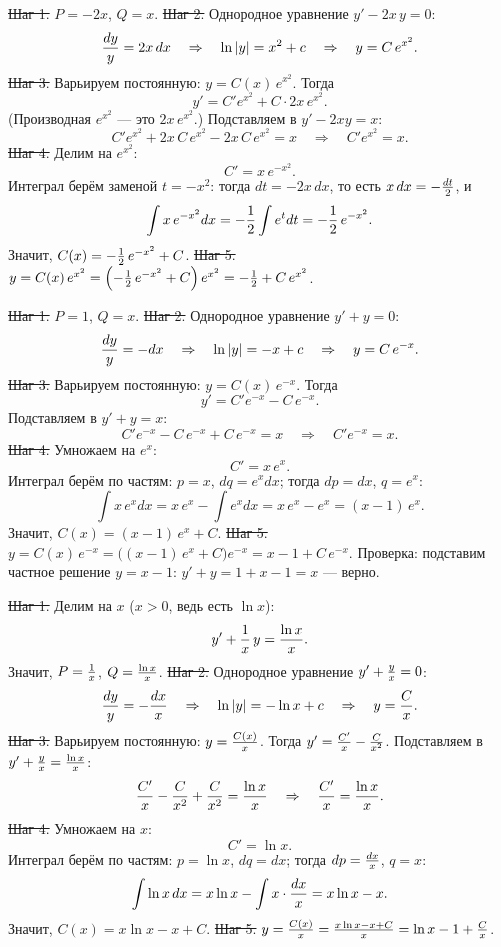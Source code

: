 \st{Шаг 1.} $P=-2x$, $Q=x$.
\st{Шаг 2.} Однородное уравнение $y'-2x\,y=0$:
$${dy\over y}=2x\,dx\quad\Rightarrow\quad\ln|y|=x^2+c
\quad\Rightarrow\quad y=C\,e^{x^2}.$$
\st{Шаг 3.} Варьируем постоянную: $y=C(x)\,e^{x^2}$. Тогда
$$y'=C'e^{x^2}+C\cdot2x\,e^{x^2}.$$
(Производная $e^{x^2}$ --- это $2x\,e^{x^2}$.) Подставляем в $y'-2xy=x$:
$$C'e^{x^2}+2x\,C\,e^{x^2}-2x\,C\,e^{x^2}=x\quad\Rightarrow\quad
C'e^{x^2}=x.$$
\st{Шаг 4.} Делим на $e^{x^2}$:
$$C'=x\,e^{-x^2}.$$
Интеграл берём заменой $t=-x^2$: тогда $dt=-2x\,dx$, то есть
$x\,dx=-{dt\over2}$, и
$$\int x\,e^{-x^2}dx=-{1\over2}\int e^{t}dt=-{1\over2}\,e^{-x^2}.$$
Значит, $C(x)=-{1\over2}\,e^{-x^2}+C$.
\st{Шаг 5.} $y=C(x)\,e^{x^2}=\left(-{1\over2}\,e^{-x^2}+C\right)e^{x^2}
=-{1\over2}+C\,e^{x^2}$.

\st{Шаг 1.} $P=1$, $Q=x$.
\st{Шаг 2.} Однородное уравнение $y'+y=0$:
$${dy\over y}=-dx\quad\Rightarrow\quad\ln|y|=-x+c
\quad\Rightarrow\quad y=C\,e^{-x}.$$
\st{Шаг 3.} Варьируем постоянную: $y=C(x)\,e^{-x}$. Тогда
$$y'=C'e^{-x}-C\,e^{-x}.$$
Подставляем в $y'+y=x$:
$$C'e^{-x}-C\,e^{-x}+C\,e^{-x}=x\quad\Rightarrow\quad C'e^{-x}=x.$$
\st{Шаг 4.} Умножаем на $e^{x}$:
$$C'=x\,e^{x}.$$
Интеграл берём по частям: $p=x$, $dq=e^{x}dx$; тогда $dp=dx$, $q=e^{x}$:
$$\int x\,e^{x}dx=x\,e^{x}-\int e^{x}dx=x\,e^{x}-e^{x}=(x-1)\,e^{x}.$$
Значит, $C(x)=(x-1)\,e^{x}+C$.
\st{Шаг 5.} $y=C(x)\,e^{-x}=\bigl((x-1)\,e^{x}+C\bigr)e^{-x}=x-1+C\,e^{-x}$.
\smallskip
Проверка: подставим частное решение $y=x-1$: $y'+y=1+x-1=x$ --- верно.

\st{Шаг 1.} Делим на $x$ ($x>0$, ведь есть $\ln x$):
$$y'+{1\over x}\,y={\ln x\over x}.$$
Значит, $P={1\over x}$, $Q={\ln x\over x}$.
\st{Шаг 2.} Однородное уравнение $y'+{y\over x}=0$:
$${dy\over y}=-{dx\over x}\quad\Rightarrow\quad\ln|y|=-\ln x+c
\quad\Rightarrow\quad y={C\over x}.$$
\st{Шаг 3.} Варьируем постоянную: $y={C(x)\over x}$. Тогда
$y'={C'\over x}-{C\over x^2}$. Подставляем в $y'+{y\over x}={\ln x\over x}$:
$${C'\over x}-{C\over x^2}+{C\over x^2}={\ln x\over x}\quad\Rightarrow\quad
{C'\over x}={\ln x\over x}.$$
\st{Шаг 4.} Умножаем на $x$:
$$C'=\ln x.$$
Интеграл берём по частям: $p=\ln x$, $dq=dx$; тогда $dp={dx\over x}$, $q=x$:
$$\int\ln x\,dx=x\ln x-\int x\cdot{dx\over x}=x\ln x-x.$$
Значит, $C(x)=x\ln x-x+C$.
\st{Шаг 5.} $y={C(x)\over x}={x\ln x-x+C\over x}=\ln x-1+{C\over x}$.

